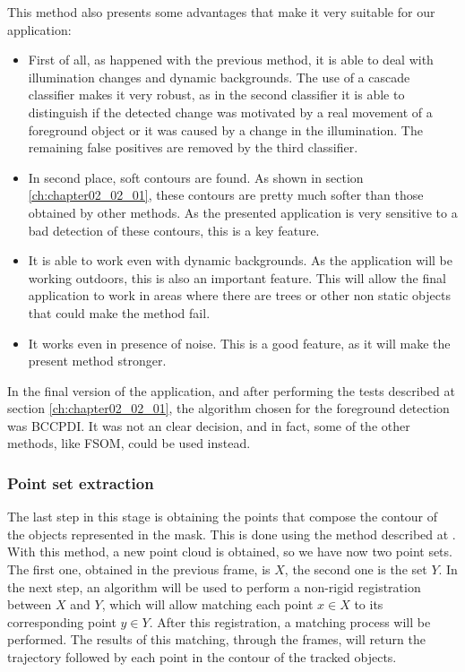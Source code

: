 \begin{itemize}
This method also presents some advantages that make it very suitable for our application:
\begin{itemize}
 \item First of all, as happened with the previous method, it is able to deal with illumination changes and dynamic backgrounds. The use of a cascade classifier makes it very robust, as in the second classifier it is able to distinguish if the detected change was motivated by a real movement of a foreground object or it was caused by a change in the illumination. The remaining false positives are removed by the third classifier.
 \item In second place, soft contours are found. As shown in section \ref{ch:chapter02_02_01}, these contours are pretty much softer than those obtained by other methods. As the presented application is very sensitive to a bad detection of these contours, this is a key feature.
 \item It is able to work even with dynamic backgrounds. As the application will be working outdoors, this is also an important feature. This will allow the final application to work in areas where there are trees or other non static objects that could make the method fail.
 \item It works even in presence of noise. This is a good feature, as it will make the present method stronger.
\end{itemize}
 
\end{itemize}

In the final version of the application, and after performing the tests described at section 
\ref{ch:chapter02_02_01}, the algorithm chosen for the foreground detection was BCCPDI. It was not an 
clear decision, and in fact, some of the other methods, like FSOM, could be used instead.

\subsubsection{Point set extraction}\label{ch:chapter02_01_01_02}

The last step in this stage is obtaining the points that compose the contour of the objects represented in the mask. This is done using the method described at \cite{suzuki1985topological}. With this method, a new point cloud is obtained, so we have now two point sets. The first one, obtained in the previous frame, is $X$, the second one is the set $Y$. In the next step, an algorithm will be used to perform a non-rigid registration between $X$ and $Y$, which will allow matching each point $x \in X$ to its corresponding point $y \in Y$. After this registration, a matching process will be performed. The results of this matching, through the frames, will return the trajectory followed by each point in the contour of the tracked objects.


